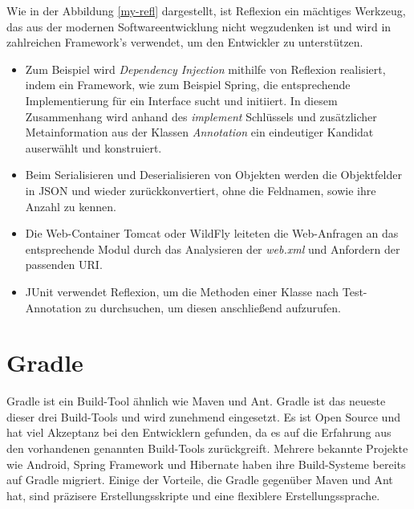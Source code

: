   Wie in der Abbildung \ref{my-refl} dargestellt, ist Reflexion ein mächtiges Werkzeug, das aus der modernen Softwareentwicklung nicht wegzudenken ist und wird in zahlreichen Framework's verwendet, um den Entwickler zu unterstützen. 

  \begin{itemize}
    \item Zum Beispiel wird \textit{Dependency Injection} mithilfe von Reflexion realisiert, indem ein Framework, wie zum Beispiel Spring, die entsprechende Implementierung für ein Interface sucht und initiiert. In diesem Zusammenhang wird anhand des \textit{implement} Schlüssels und zusätzlicher Metainformation aus der Klassen \textit{Annotation} ein eindeutiger Kandidat auserwählt und konstruiert.
    \item Beim Serialisieren und Deserialisieren von Objekten werden die Objektfelder in JSON und wieder zurückkonvertiert, ohne die Feldnamen, sowie ihre Anzahl zu kennen.
    \item Die Web-Container Tomcat oder WildFly leiteten die Web-Anfragen an das entsprechende Modul durch das Analysieren der \textit{web.xml} und Anfordern der passenden URI.
    \item JUnit verwendet Reflexion, um die Methoden einer Klasse nach Test-Annotation zu durchsuchen, um diesen anschließend aufzurufen.
  \end{itemize}



\section{Gradle}
Gradle ist ein Build-Tool ähnlich wie Maven und Ant. Gradle ist das neueste dieser drei Build-Tools und wird zunehmend eingesetzt. Es ist Open Source und hat viel Akzeptanz bei den Entwicklern gefunden, da es auf die Erfahrung aus den vorhandenen genannten Build-Tools zurückgreift. Mehrere bekannte Projekte wie Android, Spring Framework und Hibernate haben ihre Build-Systeme bereits auf Gradle migriert. Einige der Vorteile, die Gradle gegenüber Maven und Ant hat, sind präzisere Erstellungsskripte und eine flexiblere Erstellungssprache.\bigbreak

